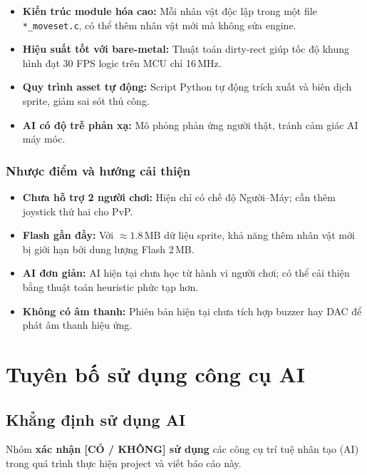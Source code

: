\documentclass[a4paper,12pt]{report}
\begin{document}
\begin{itemize}
    \item \textbf{Kiến trúc module hóa cao:} Mỗi nhân vật độc lập trong một file \texttt{*\_moveset.c}, có thể thêm nhân vật mới mà không sửa engine.
    \item \textbf{Hiệu suất tốt với bare-metal:} Thuật toán dirty-rect giúp tốc độ khung hình đạt 30 FPS logic trên MCU chỉ 16\,MHz.
    \item \textbf{Quy trình asset tự động:} Script Python tự động trích xuất và biên dịch sprite, giảm sai sót thủ công.
    \item \textbf{AI có độ trễ phản xạ:} Mô phỏng phản ứng người thật, tránh cảm giác AI máy móc.
\end{itemize}

\subsection{Nhược điểm và hướng cải thiện}

\begin{itemize}
    \item \textbf{Chưa hỗ trợ 2 người chơi:} Hiện chỉ có chế độ Người--Máy; cần thêm joystick thứ hai cho PvP.
    \item \textbf{Flash gần đầy:} Với $\approx 1.8$\,MB dữ liệu sprite, khả năng thêm nhân vật mới bị giới hạn bởi dung lượng Flash 2\,MB.
    \item \textbf{AI đơn giản:} AI hiện tại chưa học từ hành vi người chơi; có thể cải thiện bằng thuật toán heuristic phức tạp hơn.
    \item \textbf{Không có âm thanh:} Phiên bản hiện tại chưa tích hợp buzzer hay DAC để phát âm thanh hiệu ứng.
\end{itemize}

\chapter{Tuyên bố sử dụng công cụ AI}

\section{Khẳng định sử dụng AI}

Nhóm \textbf{xác nhận [CÓ / KHÔNG] sử dụng} các công cụ trí tuệ nhân tạo (AI) trong quá trình thực hiện project và viết báo cáo này.
\end{document}
